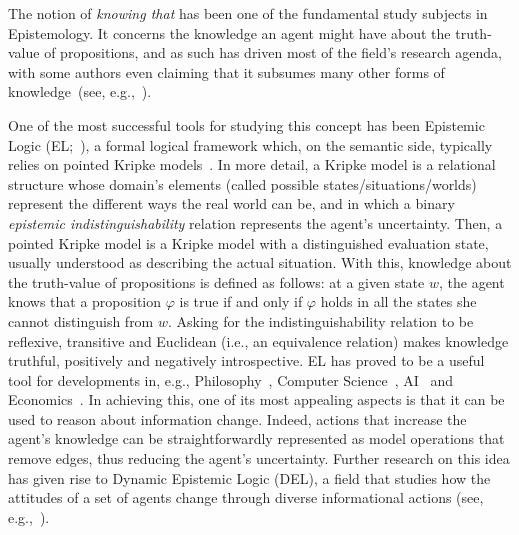 The notion of \emph{knowing that} has been one of the fundamental study subjects in Epistemology. It concerns the knowledge an agent might have about the truth-value of propositions, and as such has driven most of the field's research agenda, with some authors even claiming that it subsumes many other forms of knowledge~(see, e.g.,~\cite{BoenLycan75,stanley2001knowing,Snowdon2004}). 

 
One of the most successful tools for studying this concept has been Epistemic Logic (EL;~\cite{Hintikka:kab}), a formal logical framework which, on the semantic side, typically relies on pointed Kripke models~\cite{mlbook,HML}. In more detail, a Kripke model is a relational structure whose domain's elements (called possible states/situations/worlds) represent the different ways the real world can be, and in which a binary \emph{epistemic indistinguishability} relation represents the agent's uncertainty. Then, a pointed Kripke model is a Kripke model with a distinguished evaluation state, usually understood as describing the actual situation. With this, knowledge about the truth-value of propositions is defined as follows: at a given state $w$, the agent knows that a proposition $\varphi$ is true if and only if $\varphi$ holds in all the states she cannot distinguish from $w$. Asking for the indistinguishability relation to be reflexive, transitive and Euclidean (i.e., an equivalence relation) makes knowledge truthful, positively and negatively introspective. EL has proved to be a useful tool for developments in, e.g., Philosophy~\cite{rfe,Holliday2018}, Computer Science~\cite{RAK}, AI~\cite{elfaics} and Economics~\cite{egepgt}. In achieving this, one of its most appealing aspects is that it can be used to reason about information change. Indeed, actions that increase the agent's knowledge can be straightforwardly represented as model operations that remove edges, thus reducing the agent's uncertainty. Further research on this idea has given rise to Dynamic Epistemic Logic (DEL), a field that studies how the attitudes of a set of agents change through diverse informational actions (see, e.g.,~\cite{DELbook,vanBenthem2011ldii}). 


